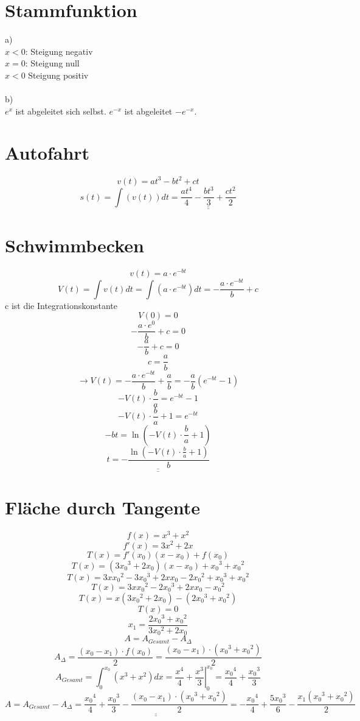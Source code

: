 \section{Stammfunktion}
a)\\
$x<0$: Steigung negativ\\
$x=0$: Steigung null\\
$x<0$ Steigung positiv\\\\
b)\\
$e^x$ ist abgeleitet sich selbst. $e^{-x}$ ist abgeleitet $-e^{-x}$. 

\section{Autofahrt}
\[ v(t) = a t^3 - b t^2 + c t \]
\[ s(t) = \int (v(t)) dt = \underline{\underline{\frac{a t^4}{4} - \frac{b t^3}{3} + \frac{c t^2}{2}}} \]

\section{Schwimmbecken}
\[ v(t) = a \cdot e^{-bt} \]
\[ V(t) = \int v(t) dt = \int \left(a \cdot e^{-bt}\right) dt = -\frac{a \cdot e^{-bt}}{b} + c \]
c ist die Integrationskonstante
\[ V(0) = 0 \]
\[ -\frac{a \cdot e^{0}}{b} + c = 0 \]
\[ -\frac{a}{b} + c = 0 \]
\[ c = \frac{a}{b} \]
\[ \rightarrow V(t) = -\frac{a \cdot e^{-bt}}{b} + \frac{a}{b} = -\frac{a}{b} \left( e^{-bt} - 1 \right) \]
\[ -V(t) \cdot \frac{b}{a} = e^{-bt} - 1 \]
\[ -V(t) \cdot \frac{b}{a} + 1 = e^{-bt} \]
\[ -bt = \ln\left(-V(t) \cdot \frac{b}{a} + 1\right) \]
\[ \underline{\underline{t = -\frac{\ln\left(-V(t) \cdot \frac{b}{a} + 1\right)}{b}}} \]
\[  \]
\[  \]
\[  \]
\[  \]
\[  \]
\[  \]

\section{Fläche durch Tangente}
\[ f(x) = x^3 + x^2 \]
\[ f'(x) = 3 x^2 + 2 x \]
\[ T(x) = f'(x_0)(x - x_0) + f(x_0) \]
\[ T(x) = (3 {x_0}^3 + 2 x_0)(x-x_0) + {x_0}^3 + {x_0}^2 \]
\[ T(x) = 3 x {x_0}^2 - 3 {x_0}^3 + 2 x x_0 - 2 {x_0}^2 + {x_0}^3 + {x_0}^2 \]
\[ T(x) = 3 x {x_0}^2 - 2 {x_0}^3 + 2 x x_0 - {x_0}^2 \]
\[ T(x) = x(3 {x_0}^2 + 2 x_0) - (2 {x_0}^3 + {x_0}^2) \]
\[ T(x) = 0 \]
\[ x_1 = \frac{2 {x_0}^3 + {x_0}^2}{3 {x_0}^2 + 2 x_0} \]
\[ A = A_{Gesamt} - A_\Delta \]
\[ A_\Delta = \frac{(x_0 - x_1) \cdot f(x_0)}{2} = \frac{(x_0 - x_1) \cdot ({x_0}^3 + {x_0}^2)}{2} \]
\[ A_{Gesamt} = \int_0^{x_0} (x^3 + x^2) dx = \left.\frac{x^4}{4} + \frac{x^3}{3} \right|_{0}^{x_0} = \frac{{x_0}^4}{4} + \frac{{x_0}^3}{3} \]
\[ A = A_{Gesamt} - A_\Delta = \underline{\underline{\frac{{x_0}^4}{4} + \frac{{x_0}^3}{3} - \frac{(x_0 - x_1) \cdot ({x_0}^3 + {x_0}^2)}{2}}} = -\frac{{x_0}^4}{4} + \frac{5 {x_0}^3}{6} - \frac{x_1 ({x_0}^3 + {x_0}^2)}{2} \]

